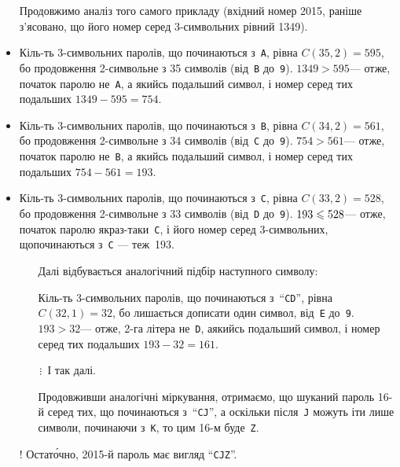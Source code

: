 \begin{small}
\begin{itemize}[leftmargin=*,itemsep=0pt,partopsep=0pt,topsep=0pt,parsep=0pt]
\item[] Продовжимо аналіз того самого прикладу (вхідний номер 2015, раніше з’ясовано, що його номер серед 3-символьних рівний 1349).

\item Кіль-ть 3-символьних паролів, що починаються з~\texttt{A}, рівна ${C(35,2) = 595}$, бо продовження %
2-символьне з 35 символів (від~\texttt{B} до~\texttt{9}). ${1349>595}$\nolinebreak[3] --- отже, початок паролю не~\texttt{A}, а якийсь подальший символ, і номер %
серед тих подальших ${1349-595=754}$.

\item Кіль-ть 3-символьних паролів, що починаються з~\texttt{B}, рівна ${C(34,2) = 561}$, бо продовження %
2-символьне з 34 символів (від~\texttt{C} до~\texttt{9}). ${754>561}$\nolinebreak[3] --- отже, початок паролю не~\texttt{B}, а якийсь подальший символ, і номер %
серед тих подальших ${754-561=193}$.

\item Кіль-ть 3-символьних паролів, що починаються з~\texttt{C}, рівна ${C(33,2) = 528}$, бо продовження %
2-символьне з 33 символів (від~\texttt{D} до~\texttt{9}). ${193\leqslant528}$\nolinebreak[3] --- отже, початок паролю якраз-таки~\texttt{C}, і його номер серед 3-символьних, що\nolinebreak[3] починаються з~\texttt{C} --- теж~193.

\begin{itemize}[leftmargin=*,itemsep=0pt,partopsep=0pt,topsep=0pt,parsep=0pt]
\item[] Далі відбувається аналогічний підбір наступного символу:

\item[\textopenbullet] Кіль-ть 3-символьних паролів, що починаються з~``\texttt{CD}'', рівна ${C(32,1)=32}$, бо лишається дописати один символ, від~\texttt{E} до~\texttt{9}. ${193>32}$\nolinebreak[3] --- отже, 2-га літера не~\texttt{D}, а\nolinebreak[3] якийсь подальший символ, і номер %
серед тих подальших ${193-32=161}$.

\item[$\isdiv$] І так далі.

\item[\textopenbullet] Продовживши аналогічні міркування, отримаємо, що шуканий пароль 16-й серед тих, що починаються з~``\texttt{CJ}'', а оскільки після~\texttt{J} можуть іти лише символи, починаючи з~\texttt{K}, то цим 16-м буде~\texttt{Z}.
\end{itemize}

\item[!] Остат\'{о}чно, 2015-й пароль має вигляд ``\texttt{CJZ}''.
\end{itemize}
\end{small}

